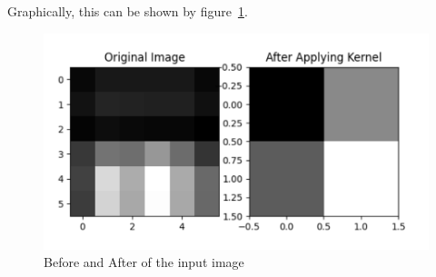 \begin{itemize}
	Graphically, this can be shown by figure~\ref{fig:kernel3}.
		\begin{figure}[htpb]
		\centering
		\includegraphics[width=.7\textwidth]{../Problem 11/kernel_F3.pdf}
		\caption{Before and After of the input image}
		\label{fig:kernel3}
	\end{figure}
	\vspace{3mm}
		
\end{itemize}
\vspace{5mm}






